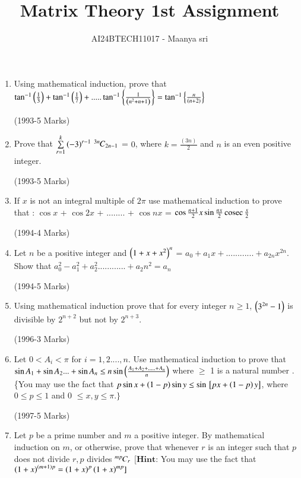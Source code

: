 \documentclass[journal,12pt,twocolumn]{IEEEtran}
\theoremstyle{remark}
\begin{document}

\vspace{3cm}

\title{Matrix Theory 1st Assignment}
\author{AI24BTECH11017 - Maanya sri}
\maketitle
\newpage
\bigskip

\renewcommand{\thefigure}{\theenumi}
\renewcommand{\thetable}{\theenumi}\begin{enumerate}[start=16] 
	\item Using mathematical induction, prove that $\tan^{-1}\left(\frac{1}{3}\right)  +  \tan^{-1}\left(\frac{1}{7}\right) + .....\tan^{-1}\left\{\frac{1}{\left(n^2 + n + 1\right)}\right\} = \tan^{-1}\left\{\frac{n}{\left(n+2\right)}\right\}$ 

		\hfill(1993-5 Marks) 
	\item Prove that $\sum\limits^{k}_{r=1} \left(-3\right)^{r-1}$ ${{}^{3n}\mkern-1muC_{2n-1}}$ = $0$, where $k=\frac{(3n)}{2}$ and $n$ is an even positive integer.

	\hfill(1993-5 Marks)
\item If $x$ is not an integral multiple of $2\pi$ use mathematical induction to prove that : 
	$\cos {x}$ + $\cos {2x}$ + ........ + $\cos{ nx}$ = $\cos{\frac{n+1}{2}x}\sin {\frac{nx}{2}}\,\text{cosec}\,{\frac{x}{2}}$

		\hfill(1994-4 Marks)
\item 
Let $n$ be a positive integer and $\left(1+x+x^2\right)^n$ = $a_0 + a_1 x + ............+ a_{2n} x^{2n}$. Show that $a_0^2 - a_1^2 + a_2^2 ............ + a_2n^2 = a_n$

		\hfill(1994-5 Marks)
\item 
Using mathematical induction prove that for every integer $n \geq 1$, $\left(3^{2n} -1\right)$ is divisible by $2^{n+2}$ but not by $2^{n+3}$.

		\hfill(1996-3 Marks)
\item 
	Let $ 0<A_i<\pi$ for $i= 1,2....,n$. Use mathematical induction to prove that $\sin{A_1} + \sin{A_2}... + \sin{A_n} \leq  n \sin{ \ensuremath{\left(\frac{A_1 + A_2 +.....+ A_n}{n}\right)}}$ where $\geq$ 1 is a natural number .\{You may use the fact that $p \sin{x} + \left(1-p\right)\sin{y}\leq \sin{\ensuremath{{}\left[px + \left(1-p\right)y\right]}}$, where $0 \leq p \leq 1 $ and 0 $\leq x,y \leq \pi .\}$

		\hfill(1997-5 Marks)
\item 
Let $p$ be a prime number and $m$ a positive integer. By mathematical induction on $m$, or otherwise, prove that whenever $r$ is an integer such that $p$ does not divide $r , p$ divides ${{}^{mp}\mkern-1muC_{r}}$
		$[ \textbf{Hint:}$ You may use the fact that $\left(1+x\right)^{\left(m+1\right)p} = \left(1+x\right)^p\left(1+x\right)^ {mp}]$


\end{enumerate}
\end{document}
